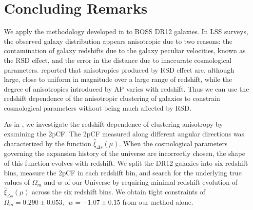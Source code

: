 \documentclass[iop]{emulateapj}
\begin{document}

\section{Concluding Remarks}

We apply the methodology developed in \cite{Li2014,Li2015} to BOSS DR12 galaxies.
In LSS surveys, the observed galaxy distribution appears anisotropic due to two reasons:
the contamination of galaxy redshifts due to the galaxy peculiar velocities, known as the RSD effect, 
and the error in the distance due to inaccurate cosmological parameters. %
\cite{Li2014} reported that anisotropies produced by RSD effect are, although large,
close to uniform in magnitude over a large range of redshift,
while the degree of anisotropies introduced by AP varies with redshift. 
Thus we can use the redshift dependence of the anisotropic clustering of galaxies to constrain cosmological parameters without 
being much affected by RSD.

As in \cite{Li2015}, we investigate the redshift-dependence of clustering anisotropy by examining the 2pCF.
The 2pCF measured along different angular directions was characterized by the function $\hat \xi_{\Delta s}(\mu)$.
When the cosmological parameters governing the expansion history of the universe are incorrectly chosen,
the shape of this function evolves with redshift.
We split the DR12 galaxies into six redshift bins, measure the 2pCF in each redshift bin,
and search for the underlying true values of $\Omega_m$ and $w$ of our Universe %
by requiring minimal redshift evolution of $\hat \xi_{\Delta s}(\mu)$ across the six redshift bins.
We obtain tight constraints of 
 $\Omega_m=0.290 \pm 0.053,\          \ w = -1.07 \pm 0.15$ %
from our method alone.
\end{document}
